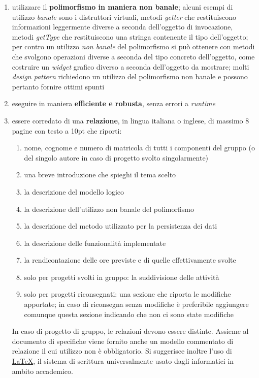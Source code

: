 \documentclass[10pt,a4paper,oneside]{article}
\begin{document}
\begin{enumerate}
 \item utilizzare il \textbf{polimorfismo in maniera non banale}; alcuni esempi di utilizzo \emph{banale} sono i distruttori virtuali, metodi \emph{getter} che restituiscono informazioni leggermente diverse a seconda dell'oggetto di invocazione, metodi \emph{getType} che restituiscono una stringa contenente il tipo dell'oggetto; per contro un utilizzo \emph{non banale} del polimorfismo si può ottenere con metodi che svolgono operazioni diverse a seconda del tipo concreto dell'oggetto, come costruire un \emph{widget} grafico diverso a seconda dell'oggetto da mostrare; molti \emph{design pattern} richiedono un utilizzo del polimorfismo non banale e possono pertanto fornire ottimi spunti
 \item eseguire in maniera \textbf{efficiente e robusta}, senza errori a \emph{runtime}
 \item essere corredato di una \textbf{relazione}, in lingua italiana o inglese, di massimo 8 pagine con testo a 10pt che riporti:
 \begin{enumerate}
  \item nome, cognome e numero di matricola di tutti i componenti del gruppo (o del singolo autore in caso di progetto svolto singolarmente)
  \item una breve introduzione che spieghi il tema scelto
  \item la descrizione del modello logico
  \item la descrizione dell'utilizzo non banale del polimorfismo
  \item la descrizione del metodo utilizzato per la persistenza dei dati
  \item la descrizione delle funzionalità implementate
  \item la rendicontazione delle ore previste e di quelle effettivamente svolte
  \item solo per progetti svolti in gruppo: la suddivisione delle attività
  \item solo per progetti riconsegnati: una sezione che riporta le modifiche apportate; in caso di riconsegna senza modifiche è preferibile aggiungere comunque questa sezione indicando che non ci sono state modifiche
 \end{enumerate}
 In caso di progetto di gruppo, le relazioni devono essere distinte. Assieme al documento di specifiche viene fornito anche un modello commentato di relazione il cui utilizzo non è obbligatorio. Si suggerisce inoltre l'uso di \href{https://it.wikipedia.org/wiki/LaTeX}{LaTeX}, il sistema di scrittura universalmente usato dagli informatici in ambito accademico.
\end{enumerate}
\end{document}
